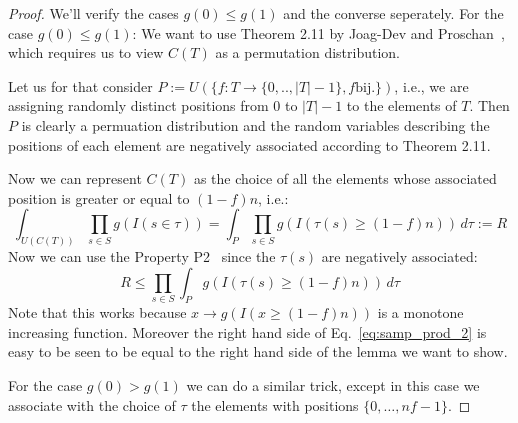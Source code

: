 \documentclass{article}
\theoremstyle{definition}
\begin{document}
\begin{proof}
We'll verify the cases $g(0) \leq g(1)$ and the converse seperately. For the case $g(0) \leq g(1)$:
We want to use Theorem 2.11 by Joag-Dev and Proschan~\cite{joagdev1983}, which requires us to view $C(T)$ as a permutation distribution.

Let us for that consider $P := U(\{f : T \rightarrow \{0,..,|T|-1\}, f \textrm{bij.}\})$, i.e., we are assigning randomly distinct positions from $0$ to $|T|-1$ to the elements
of $T$. Then $P$ is clearly a permuation distribution and the random variables describing the positions of each element are negatively associated according to Theorem 2.11.

Now we can represent $C(T)$ as the choice of all the elements whose associated position is greater or equal to $(1-f)n$, i.e.:
\begin{equation*}
  \int_{U(C(T))} \prod_{s \in S} g(I(s \in \tau)) = \int_P \prod_{s \in S} g(I(\tau(s) \geq (1-f)n)) \, d\tau := R
\end{equation*}
Now we can use the Property P2~\cite[Page 288]{joagdev1983} since the $\tau(s)$ are negatively associated:
\begin{equation}\label{eq:samp_prod_2}
  R \leq \prod_{s \in S} \int_P g(I(\tau(s) \geq (1-f)n)) \, d\tau
\end{equation}
Note that this works because $x \rightarrow g(I(x \geq (1-f)n))$ is a monotone increasing function.
Moreover the right hand side of Eq.~\ref{eq:samp_prod_2} is easy to be seen to be equal to the right hand side of the lemma we want to show.

For the case $g(0) > g(1)$ we can do a similar trick, except in this case we associate with the choice of $\tau$ the elements with positions $\{0,\ldots,nf-1\}$.
\end{proof}
\end{document}
